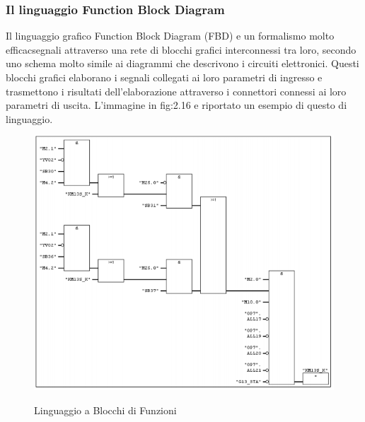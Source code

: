 \documentclass[12pt, a4paper, oneside]{book}
\begin{document}
\subsubsection{Il linguaggio Function Block Diagram}
Il linguaggio grafico Function Block Diagram (FBD) e un formalismo molto efficacsegnali attraverso una rete di blocchi grafici interconnessi tra loro, secondo uno schema molto simile ai diagrammi che descrivono i circuiti elettronici. Questi blocchi grafici elaborano i segnali collegati ai loro parametri di ingresso e trasmettono i risultati dell’elaborazione attraverso i connettori connessi ai loro parametri di uscita.
L’immagine in fig:2.16 e riportato un esempio di questo di linguaggio.

	\begin{figure}[H]
	\centering
	\includegraphics[width=12cm]{Immagini/FB}
	\label{FB}
	\caption{Linguaggio a Blocchi di Funzioni}
\end{figure}
\end{document}
